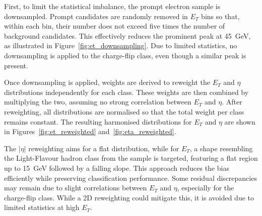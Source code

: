 First, to limit the statistical imbalance, the prompt electron sample is downsampled. Prompt candidates are randomly removed in $E_{T}$ bins so that, within each bin, their number does not exceed five times the number of background candidates. This effectively reduces the prominent peak at 45~GeV, as illustrated in Figure~\ref{fig:et_downsampling}. Due to limited statistics, no downsampling is applied to the charge-flip class, even though a similar peak is present.

Once downsampling is applied, weights are derived to reweight the $E_{T}$ and $\eta$ distributions independently for each class. These weights are then combined by multiplying the two, assuming no strong correlation between $E_{T}$ and $\eta$. After reweighting, all distributions are normalised so that the total weight per class remains constant. The resulting harmonised distributions for $E_{T}$ and $\eta$ are shown in Figures~\ref{fig:et_reweighted} and~\ref{fig:eta_reweighted}.

The $|\eta|$ reweighting aims for a flat distribution, while for $E_{T}$, a shape resembling the Light-Flavour hadron class from the \ttbar sample is targeted, featuring a flat region up to 15~GeV followed by a falling slope. This approach reduces the bias efficiently while preserving classification performance. Some residual discrepancies may remain due to slight correlations between $E_{T}$ and $\eta$, especially for the charge-flip class. While a 2D reweighting could mitigate this, it is avoided due to limited statistics at high $E_{T}$.

